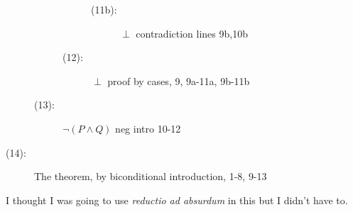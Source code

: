 \documentclass[12pt]{article}
\begin{document}
\begin{description}
\begin{description}
\begin{description}
\begin{description}
\item[(11b):]  $\perp$ contradiction lines 9b,10b

\end{description}

\item[(12):]  $\perp$ proof by cases, 9, 9a-11a, 9b-11b

\end{description}

\item[(13):]  $\neg(P \wedge Q)$  neg intro 10-12

\end{description}

\item[(14):]  The theorem, by biconditional introduction, 1-8, 9-13

\end{description}

I thought I was going to use {\em reductio ad absurdum\/} in this but I didn't have to.
\end{document}
